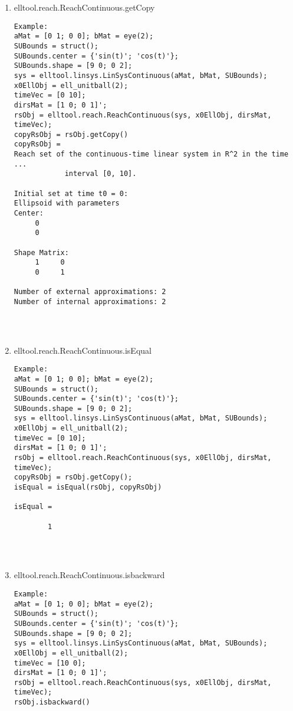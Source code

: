 \begin{enumerate}
\begin{lstlisting}
\end{lstlisting}
\fontfamily{\familydefault}
\selectfont
\item {elltool.reach.ReachContinuous.getCopy}
\selectfont
\begin{lstlisting}
Example:
aMat = [0 1; 0 0]; bMat = eye(2);
SUBounds = struct();
SUBounds.center = {'sin(t)'; 'cos(t)'};
SUBounds.shape = [9 0; 0 2];
sys = elltool.linsys.LinSysContinuous(aMat, bMat, SUBounds);
x0EllObj = ell_unitball(2);
timeVec = [0 10];
dirsMat = [1 0; 0 1]';
rsObj = elltool.reach.ReachContinuous(sys, x0EllObj, dirsMat, timeVec);
copyRsObj = rsObj.getCopy()
copyRsObj =
Reach set of the continuous-time linear system in R^2 in the time ...
            interval [0, 10].

Initial set at time t0 = 0:
Ellipsoid with parameters
Center:
     0
     0

Shape Matrix:
     1     0
     0     1

Number of external approximations: 2
Number of internal approximations: 2




\end{lstlisting}
\fontfamily{\familydefault}
\selectfont
\item {elltool.reach.ReachContinuous.isEqual}
\selectfont
\begin{lstlisting}
Example:
aMat = [0 1; 0 0]; bMat = eye(2);
SUBounds = struct();
SUBounds.center = {'sin(t)'; 'cos(t)'};
SUBounds.shape = [9 0; 0 2];
sys = elltool.linsys.LinSysContinuous(aMat, bMat, SUBounds);
x0EllObj = ell_unitball(2);
timeVec = [0 10];
dirsMat = [1 0; 0 1]';
rsObj = elltool.reach.ReachContinuous(sys, x0EllObj, dirsMat, timeVec);
copyRsObj = rsObj.getCopy();
isEqual = isEqual(rsObj, copyRsObj)

isEqual =

        1




\end{lstlisting}
\fontfamily{\familydefault}
\selectfont
\item {elltool.reach.ReachContinuous.isbackward}
\selectfont
\begin{lstlisting}
Example:
aMat = [0 1; 0 0]; bMat = eye(2);
SUBounds = struct();
SUBounds.center = {'sin(t)'; 'cos(t)'};
SUBounds.shape = [9 0; 0 2];
sys = elltool.linsys.LinSysContinuous(aMat, bMat, SUBounds);
x0EllObj = ell_unitball(2);
timeVec = [10 0];
dirsMat = [1 0; 0 1]';
rsObj = elltool.reach.ReachContinuous(sys, x0EllObj, dirsMat, timeVec);
rsObj.isbackward()


\end{lstlisting}
\end{enumerate}

